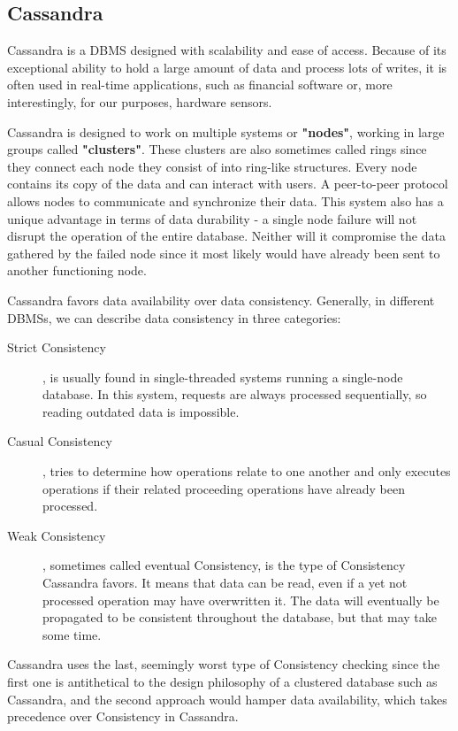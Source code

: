 \subsection{Cassandra}
\label{subsec:background:second_section:first_subsection}
\par Cassandra is a DBMS designed with scalability and ease of access. Because of its exceptional ability to hold a large amount of data and process lots of writes, it is often used in real-time applications, such as financial software or, more interestingly, for our purposes, hardware sensors\citep{CassandraUseCase}. 
\par Cassandra is designed to work on multiple systems or \textbf{"nodes"}, working in large groups called \textbf{"clusters"}. These clusters are also sometimes called rings since they connect each node they consist of into ring-like structures. Every node contains its copy of the data and can interact with users. A peer-to-peer protocol allows nodes to communicate and synchronize their data. This system also has a unique advantage in terms of data durability - a single node failure will not disrupt the operation of the entire database. Neither will it compromise the data gathered by the failed node since it most likely would have already been sent to another functioning node\citep{HewittCassandra}.
\par Cassandra favors data availability over data consistency. Generally, in different DBMSs, we can describe data consistency in three categories:
\begin{description}
  \item [Strict Consistency], is usually found in single-threaded systems running a single-node database. In this system, requests are always processed sequentially, so reading outdated data is impossible.
  \item [Casual Consistency], tries to determine how operations relate to one another and only executes operations if their related proceeding operations have already been processed.
  \item [Weak Consistency], sometimes called eventual Consistency, is the type of Consistency Cassandra favors. It means that data can be read, even if a yet not processed operation may have overwritten it. The data will eventually be propagated to be consistent throughout the database, but that may take some time.
\end{description}
\par Cassandra uses the last, seemingly worst type of Consistency checking since the first one is antithetical to the design philosophy of a clustered database such as Cassandra, and the second approach would hamper data availability, which takes precedence over Consistency in Cassandra\citep{HewittCassandra}.
